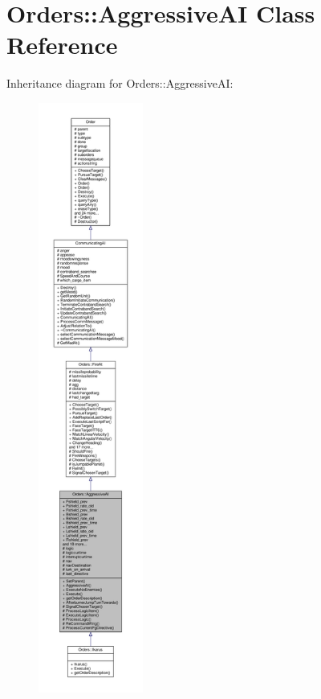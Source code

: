 \hypertarget{classOrders_1_1AggressiveAI}{}\section{Orders\+:\+:Aggressive\+AI Class Reference}
\label{classOrders_1_1AggressiveAI}


Inheritance diagram for Orders\+:\+:Aggressive\+AI\+:
\nopagebreak
\begin{figure}[H]
\begin{center}
\leavevmode
\includegraphics[height=550pt]{d7/dc7/classOrders_1_1AggressiveAI__inherit__graph}
\end{center}
\end{figure}


